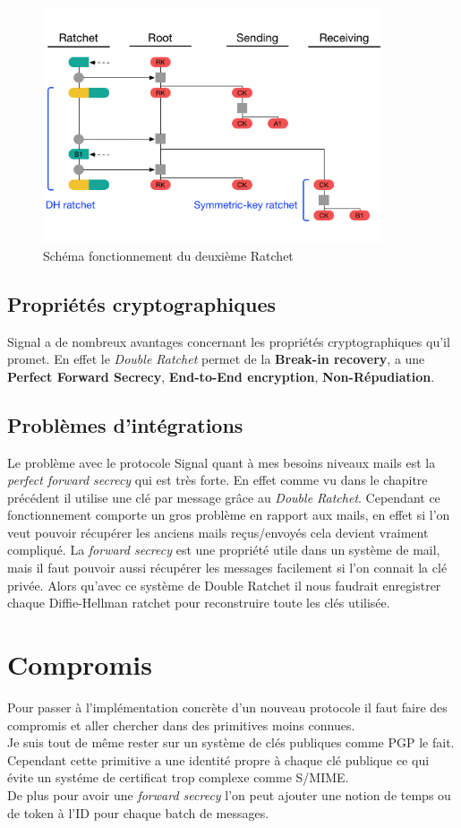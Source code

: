 \begin{figure}[h!]
	\centering
	\includegraphics[width=10cm]{images/secondRatchet.png}
	\caption{Schéma fonctionnement du deuxième Ratchet\cite{doubleratchet}}
	\label{fig:signalSecond}
\end{figure}
\subsection{Propriétés cryptographiques}
Signal a de nombreux avantages concernant les propriétés cryptographiques qu'il promet. En effet le \textit{Double Ratchet} permet de la \textbf{Break-in recovery}, a une \textbf{Perfect Forward Secrecy}, \textbf{End-to-End encryption}, \textbf{Non-Répudiation}.
\subsection{Problèmes d'intégrations}
Le problème avec le protocole Signal quant à mes besoins niveaux mails est la \textit{perfect forward secrecy} qui est très forte. En effet comme vu dans le chapitre précédent il utilise une clé par message grâce au \textit{Double Ratchet}. Cependant ce fonctionnement comporte un gros problème en rapport aux mails, en effet si l'on veut pouvoir récupérer les anciens mails reçus/envoyés cela devient vraiment compliqué. La \textit{forward secrecy} est une propriété utile dans un système de mail, mais il faut pouvoir aussi récupérer les messages facilement si l'on connait la clé privée. Alors qu'avec ce système de Double Ratchet il nous faudrait enregistrer chaque Diffie-Hellman ratchet pour reconstruire toute les clés utilisée.
\section{Compromis}
Pour passer à l'implémentation concrète d'un nouveau protocole il faut faire des compromis et aller chercher dans des primitives moins connues.\\
Je suis tout de même rester sur un système de clés publiques comme PGP le fait. Cependant cette primitive a une identité propre à chaque clé publique ce qui évite un systéme de certificat trop complexe comme S/MIME.\\
De plus pour avoir une \textit{forward secrecy} l'on peut ajouter une notion de temps ou de token à l'ID pour chaque batch de messages.
